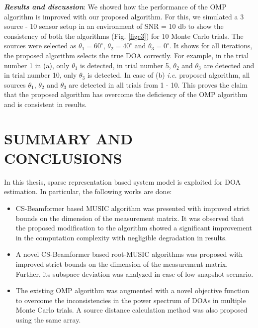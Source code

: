 \documentclass[12pt,a4paper]{article}
\theoremstyle{plain}
\theoremstyle{definition}
\begin{document}
\textbf{\emph{Results and discussion}}: 
We showed how the performance of the OMP algorithm is improved with our proposed algorithm. For this, we simulated a 3 source - 10 sensor setup in an environment of SNR = 10 db to show the consistency of both the algorithms (Fig. \ref{figc3}) for 10 Monte Carlo trials. The sources were selected as $\theta_1 = 60^\circ$, $\theta_2 = 40^\circ$ and $\theta_3 = 0^\circ$. It shows for all iterations, the proposed algorithm selects the true DOA correctly. For example, in the trial number 1 in (a), only $\theta_1$ is detected, in trial number 5, $\theta_2$ and $\theta_3$ are detected and in trial number 10, only $\theta_3$ is detected. In case of (b) \textit{i.e.} proposed algorithm, all sources $\theta_1$, $\theta_2$ and $\theta_3$ are detected in all trials from 1 - 10. This proves the claim that the proposed algorithm has overcome the deficiency of the OMP algorithm and is consistent in results.

\section{SUMMARY AND CONCLUSIONS}
In this thesis, sparse representation based system model is exploited for DOA estimation. In particular, the following works are done:

\begin{itemize}
\item CS-Beamformer based MUSIC algorithm was presented with improved strict bounds on the dimension of the measurement matrix. It was observed that the proposed modification to the algorithm showed a significant improvement in the computation complexity with negligible degradation in results.

\item A novel CS-Beamformer based root-MUSIC algorithms was proposed with improved strict bounds on the dimension of the measurement matrix. Further, its subspace deviation was analyzed in case of low snapshot scenario. 

\item The existing OMP algorithm was augmented with a novel objective function to overcome the inconsistencies in the power spectrum of DOAs in multiple Monte Carlo trials. A source distance calculation method was also proposed using the same array. 

\end{itemize}


\clearpage
 

\end{document}
